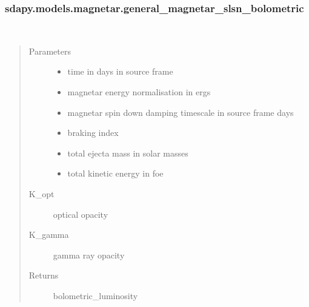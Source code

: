 \documentclass[letterpaper,10pt,english]{sphinxmanual}
\begin{document}
\subsubsection{sdapy.models.magnetar.general\_magnetar\_slsn\_bolometric}
\label{\detokenize{generated/sdapy.models.magnetar.general_magnetar_slsn_bolometric:sdapy-models-magnetar-general-magnetar-slsn-bolometric}}\label{\detokenize{generated/sdapy.models.magnetar.general_magnetar_slsn_bolometric::doc}}

\begin{fulllineitems}
\label{\detokenize{generated/sdapy.models.magnetar.general_magnetar_slsn_bolometric:sdapy.models.magnetar.general_magnetar_slsn_bolometric}}~\begin{quote}\begin{description}
\item[{Parameters}] \leavevmode\begin{itemize}
\item {} 
 \textendash{} time in days in source frame

\item {} 
 \textendash{} magnetar energy normalisation in ergs

\item {} 
 \textendash{} magnetar spin down damping timescale in source frame days

\item {} 
 \textendash{} braking index

\item {} 
 \textendash{} total ejecta mass in solar masses

\item {} 
 \textendash{} total kinetic energy in foe

\end{itemize}

\item[{K\_opt}] \leavevmode
optical opacity

\item[{K\_gamma}] \leavevmode
gamma ray opacity

\item[{Returns}] \leavevmode
bolometric\_luminosity

\end{description}\end{quote}

\end{fulllineitems}
\end{document}
